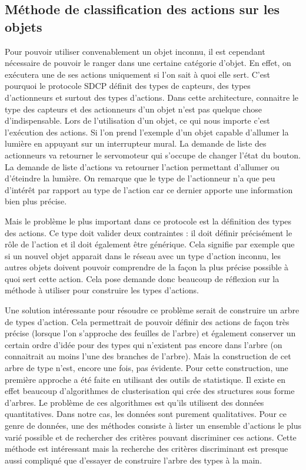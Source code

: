 	\subsection{Méthode de classification des actions sur les objets}
		Pour pouvoir utiliser convenablement un objet inconnu, il est cependant nécessaire de pouvoir
		le ranger dans une certaine catégorie d'objet. En effet, on exécutera une de ses actions 
		uniquement si l'on sait à quoi elle sert. C'est pourquoi le protocole SDCP définit des types
		de capteurs, des types d'actionneurs et surtout des types d'actions. Dans cette architecture,
		connaitre le type des capteurs et des actionneurs d'un objet n'est pas quelque chose 
		d'indispensable. Lors de l'utilisation d'un objet, ce qui nous importe c'est l'exécution 
		des actions. Si l'on prend l'exemple d'un objet capable d'allumer la lumière en appuyant 
		sur un interrupteur mural. La demande de liste des actionneurs va retourner le servomoteur
		qui s'occupe de changer l'état du bouton. La demande de liste d'actions va retourner l'action
		permettant d'allumer ou d'éteindre la lumière. On remarque que le type de l'actionneur n'a
		que peu d'intérêt par rapport au type de l'action car ce dernier apporte une information bien
		plus précise.
		
		Mais le problème le plus important dans ce protocole est la définition des types des actions.
		Ce type doit valider deux contraintes : il doit définir précisément le rôle de l'action et
		il doit également être générique. Cela signifie par exemple que si un nouvel objet
		apparait dans le réseau avec un type d'action inconnu, les autres objets doivent pouvoir 
		comprendre de la façon la plus précise possible à quoi sert cette action. Cela pose demande
		donc beaucoup de réflexion sur la méthode à utiliser pour construire les types d'actions.
		
		Une solution intéressante pour résoudre ce problème serait de construire un arbre de types
		d'action. Cela permettrait de pouvoir définir des actions de façon très précise (lorsque l'on
		s'approche des feuilles de l'arbre) et également conserver un certain ordre d'idée pour 
		des types qui n'existent pas encore dans l'arbre (on connaitrait au moins l'une des branches de
		l'arbre). Mais la construction de cet arbre de type n'est, encore une fois, pas évidente.
		Pour cette construction, une première approche a été faite en utilisant des outils de
		statistique. Il existe en effet beaucoup d'algorithmes de clusterisation qui crée des
		structures sous forme d'arbres. Le problème de ces algorithmes est qu'ils utilisent des 
		données
		quantitatives. Dans notre cas, les données sont purement qualitatives. Pour ce genre de
		données, une des méthodes consiste à lister un ensemble d'actions le plus varié possible et
		de rechercher des critères pouvant discriminer ces actions. Cette méthode est intéressant mais
		la recherche des critères discriminant est presque aussi compliqué que d'essayer de construire
		l'arbre des types à la main.
		
